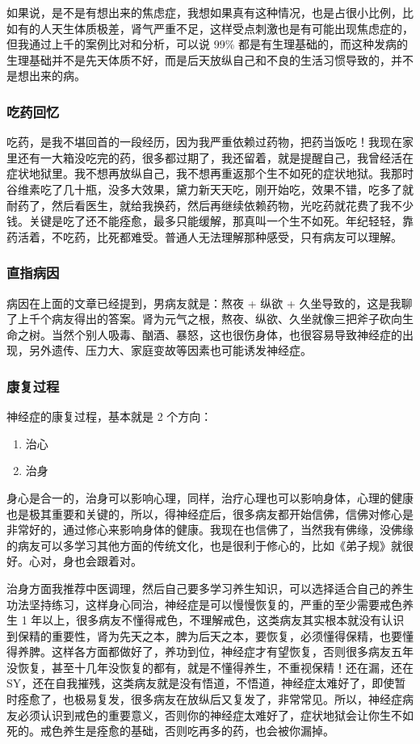 \documentclass[fontset=founder]{ctexart}
\begin{document}
如果说，是不是有想出来的焦虑症，我想如果真有这种情况，也是占很小比例，比如有的人天生体质极差，肾气严重不足，这样受点刺激也是有可能出现焦虑症的，但我通过上千的案例比对和分析，可以说 99\% 都是有生理基础的，而这种发病的生理基础并不是先天体质不好，而是后天放纵自己和不良的生活习惯导致的，并不是想出来的病。

\subsubsection{吃药回忆}

吃药，是我不堪回首的一段经历，因为我严重依赖过药物，把药当饭吃！我现在家里还有一大箱没吃完的药，很多都过期了，我还留着，就是提醒自己，我曾经活在症状地狱里。我不想再放纵自己，我不想再重返那个生不如死的症状地狱。我那时谷维素吃了几十瓶，没多大效果，黛力新天天吃，刚开始吃，效果不错，吃多了就耐药了，然后看医生，就给我换药，然后再继续依赖药物，光吃药就花费了我不少钱。关键是吃了还不能痊愈，最多只能缓解，那真叫一个生不如死。年纪轻轻，靠药活着，不吃药，比死都难受。普通人无法理解那种感受，只有病友可以理解。

\subsubsection{直指病因}

病因在上面的文章已经提到，男病友就是：熬夜 + 纵欲 + 久坐导致的，这是我聊了上千个病友得出的答案。肾为元气之根，熬夜、纵欲、久坐就像三把斧子砍向生命之树。当然个别人吸毒、酗酒、暴怒，这也很伤身体，也很容易导致神经症的出现，另外遗传、压力大、家庭变故等因素也可能诱发神经症。

\subsubsection{康复过程}

神经症的康复过程，基本就是 2 个方向：

\begin{enumerate}
    \item 治心
    \item 治身
\end{enumerate}

身心是合一的，治身可以影响心理，同样，治疗心理也可以影响身体，心理的健康也是极其重要和关键的，所以，得神经症后，很多病友都开始信佛，信佛对修心是非常好的，通过修心来影响身体的健康。我现在也信佛了，当然我有佛缘，没佛缘的病友可以多学习其他方面的传统文化，也是很利于修心的，比如《弟子规》就很好。心对，身也会跟着对。

治身方面我推荐中医调理，然后自己要多学习养生知识，可以选择适合自己的养生功法坚持练习，这样身心同治，神经症是可以慢慢恢复的，严重的至少需要戒色养生 1 年以上，很多病友不懂得戒色，不理解戒色，这类病友其实根本就没有认识到保精的重要性，肾为先天之本，脾为后天之本，要恢复，必须懂得保精，也要懂得养脾。这样各方面都做好了，养功到位，神经症才有望恢复，否则很多病友五年没恢复，甚至十几年没恢复的都有，就是不懂得养生，不重视保精！还在漏，还在 SY，还在自我摧残，这类病友就是没有悟道，不悟道，神经症太难好了，即使暂时痊愈了，也极易复发，很多病友在放纵后又复发了，非常常见。所以，神经症病友必须认识到戒色的重要意义，否则你的神经症太难好了，症状地狱会让你生不如死的。戒色养生是痊愈的基础，否则吃再多的药，也会被你漏掉。
\end{document}

